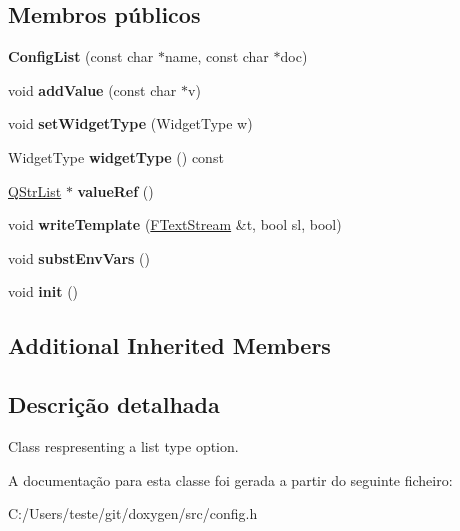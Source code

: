 \subsection*{Membros públicos}
\begin{DoxyCompactItemize}
\item 
\hypertarget{class_config_list_a9a493f3389ee46cfc97c8443c8537a1a}{{\bfseries Config\-List} (const char $\ast$name, const char $\ast$doc)}\label{class_config_list_a9a493f3389ee46cfc97c8443c8537a1a}

\item 
\hypertarget{class_config_list_a6330b95a0b46d7452b8c0e7f61a523de}{void {\bfseries add\-Value} (const char $\ast$v)}\label{class_config_list_a6330b95a0b46d7452b8c0e7f61a523de}

\item 
\hypertarget{class_config_list_aefd9d316a5af38db88268212736d35a2}{void {\bfseries set\-Widget\-Type} (Widget\-Type w)}\label{class_config_list_aefd9d316a5af38db88268212736d35a2}

\item 
\hypertarget{class_config_list_a28a506144c8747cb26dffbfb11e63ee5}{Widget\-Type {\bfseries widget\-Type} () const }\label{class_config_list_a28a506144c8747cb26dffbfb11e63ee5}

\item 
\hypertarget{class_config_list_a4761b22290018a373024647d20c8a1d8}{\hyperlink{class_q_str_list}{Q\-Str\-List} $\ast$ {\bfseries value\-Ref} ()}\label{class_config_list_a4761b22290018a373024647d20c8a1d8}

\item 
\hypertarget{class_config_list_ad532b92c9971149d194403dff3458ba7}{void {\bfseries write\-Template} (\hyperlink{class_f_text_stream}{F\-Text\-Stream} \&t, bool sl, bool)}\label{class_config_list_ad532b92c9971149d194403dff3458ba7}

\item 
\hypertarget{class_config_list_a79866440425087f224d4f77311efad6a}{void {\bfseries subst\-Env\-Vars} ()}\label{class_config_list_a79866440425087f224d4f77311efad6a}

\item 
\hypertarget{class_config_list_a02fd73d861ef2e4aabb38c0c9ff82947}{void {\bfseries init} ()}\label{class_config_list_a02fd73d861ef2e4aabb38c0c9ff82947}

\end{DoxyCompactItemize}
\subsection*{Additional Inherited Members}


\subsection{Descrição detalhada}
Class respresenting a list type option. 

A documentação para esta classe foi gerada a partir do seguinte ficheiro\-:\begin{DoxyCompactItemize}
\item 
C\-:/\-Users/teste/git/doxygen/src/config.\-h\end{DoxyCompactItemize}
